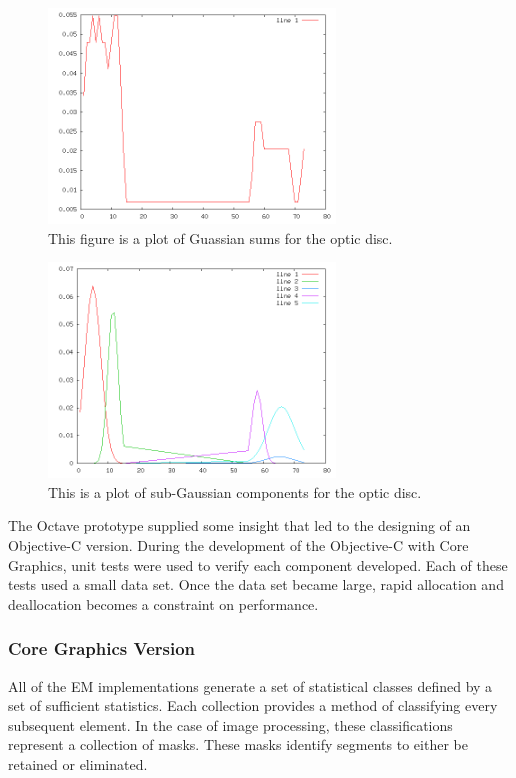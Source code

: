 \documentclass[11pt]{article}
\begin{document}
  


\begin{figure}[htbp] %
   \centering
   \includegraphics[width=3in]{plot.png} 
   \caption{This figure is a plot of Guassian sums for the optic disc.}
   \label{histogram-optic-disc}
\end{figure}


\begin{figure}[htbp] %
   \centering
   \includegraphics[width=3in]{probability.png} 
   \caption{This is a plot of sub-Gaussian components for the optic disc.}
   \label{histograms-optic-disc}
\end{figure}

The Octave prototype supplied some insight that led to the designing of an Objective-C version. 
During the development of the Objective-C with Core Graphics, unit tests were used to verify each component developed.   Each of these tests used a small data set.  Once the data set became large, rapid allocation and deallocation becomes a constraint on performance.   


\subsubsection{Core Graphics Version}
All of the EM implementations generate a set of statistical classes defined by a set of sufficient statistics.  Each collection provides a method of classifying every subsequent element. %
In the case of image processing, these classifications represent a collection of masks.  These masks identify segments to either be retained or eliminated.  
\end{document}
